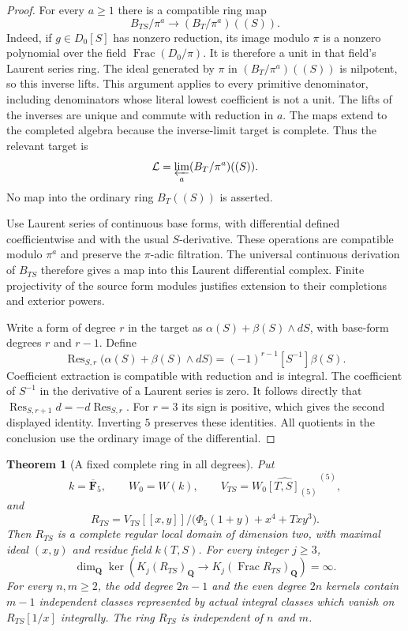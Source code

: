 \documentclass[11pt,a4paper]{article}
\newtheorem{theorem}{Theorem}[section]
\theoremstyle{remark}
\begin{document}
\begin{proof}
For every $a\geq1$ there is a compatible ring map
\[
 B_{TS}/\pi^a
       \longrightarrow (B_T/\pi^a)((S)).
\]
Indeed, if $g\in D_0[S]$ has nonzero reduction, its image modulo
$\pi$ is a nonzero polynomial over the field
$\operatorname{Frac}(D_0/\pi)$.  It is therefore a unit in that
field's Laurent series ring.  The ideal generated by $\pi$ in
$(B_T/\pi^a)((S))$ is nilpotent, so this inverse lifts.  This
argument applies to every primitive denominator, including
denominators whose literal lowest coefficient is not a unit.
The lifts of the inverses are unique and commute with reduction
in $a$.  The maps extend to the completed algebra because the
inverse-limit target is complete.  Thus the relevant target is
\[
 \mathcal L=\varprojlim_a(B_T/\pi^a)((S)).
\]
No map into the ordinary ring $B_T((S))$ is asserted.

Use Laurent series of continuous base forms, with differential
defined coefficientwise and with the usual $S$-derivative.
These operations are compatible modulo $\pi^a$ and preserve
the $\pi$-adic filtration.  The universal continuous derivation
of $B_{TS}$ therefore gives a map into this Laurent differential
complex.  Finite projectivity of the source form modules
justifies extension to their completions and exterior powers.

Write a form of degree $r$ in the target as
$\alpha(S)+\beta(S)\wedge dS$, with base-form degrees $r$
and $r-1$.  Define
\[
 \operatorname{Res}_{S,r}
       \bigl(\alpha(S)+\beta(S)\wedge dS\bigr)
      =(-1)^{r-1}[S^{-1}]\beta(S).
\]
Coefficient extraction is compatible with reduction and is
integral.  The coefficient of $S^{-1}$ in the derivative of a
Laurent series is zero.  It follows directly that
$\operatorname{Res}_{S,r+1}d=-d\operatorname{Res}_{S,r}$.
For $r=3$ its sign is positive, which gives the second displayed
identity.  Inverting $5$ preserves these identities.  All
quotients in the conclusion use the ordinary image of the
differential.
\end{proof}

\begin{theorem}[A fixed complete ring in all degrees]
\label{thm:dimtwoCompleteAllDegreesInfiniteRank}
Put
\[
 k=\overline{\mathbf F}_5,\qquad W_0=W(k),\qquad
 V_{TS}=\widehat{W_0[T,S]_{(5)}}^{\,(5)},
\]
and
\[
 R_{TS}=V_{TS}[[x,y]]/
       \bigl(\Phi_5(1+y)+x^4+Txy^3\bigr).
\]
Then $R_{TS}$ is a complete regular local domain of dimension
two, with maximal ideal $(x,y)$ and residue field $k(T,S)$.
For every integer $j\geq3$,
\[
 \dim_{\mathbf Q}\ker\!\left(
 K_j(R_{TS})_{\mathbf Q}\longrightarrow
 K_j(\operatorname{Frac}R_{TS})_{\mathbf Q}\right)=\infty.
\]
For every $n,m\geq2$, the odd degree $2n-1$ and the even degree
$2n$ kernels contain $m-1$ independent classes represented by
actual integral classes which vanish on $R_{TS}[1/x]$ integrally.
The ring $R_{TS}$ is independent of $n$ and $m$.
\end{theorem}
\end{document}
